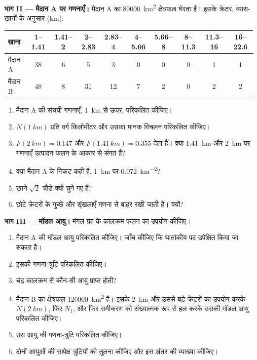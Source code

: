 \begin{problem}[{सप्ताहांत समस्या --- मंगल का क्रोड और दो
काल्पनिक लावा मैदानों की आयु}]
\medskip\noindent\textbf{भाग II --- मैदान A पर गणनाएँ।} मैदान A का
\qty{80000}{km^2} क्षेत्रफल घेरता है। इसके क्रेटर, व्यास-खानों के अनुसार (km):
\begin{center}
\small
\begin{tabular}{lccccccccc}
\hline
खाना & 1--1.41 & 1.41--2 & 2--2.83 & 2.83--4 & 4--5.66 & 5.66--8 & 8--11.3 & 11.3--16 & 16--22.6 \\
\hline
मैदान A & 38 & 6 & 5 & 3 & 0 & 0 & 0 & 1 & 1 \\
मैदान B & 48 & 8 & 31 & 12 & 7 & 2 & 0 & 2 & 2 \\
\hline
\end{tabular}
\end{center}
\begin{enumerate}[resume]
\item मैदान A की संचयी गणनाएँ, \qty{1}{km} से ऊपर, परिकलित कीजिए।
\item $N(\qty{1}{km})$ प्रति वर्ग किलोमीटर और उसका मानक
  विचलन परिकलित कीजिए।
\item {} $F(\qty{2}{km}) = 0.147$ और
  $F(\qty{1.41}{km}) = 0.355$ देता है। क्या \qty{1.41}{km} और \qty{2}{km} पर
  गणनाएँ उत्पादन फलन के आकार से संगत हैं?
\item क्या मैदान A  के निकट कहीं है,
  \qty{1}{km} पर \qty{0.072}{km^{-2}}?
\item खाने $\sqrt2$ चौड़े क्यों चुने गए हैं?
\item छोटे क्रेटरों के गुच्छे और शृंखलाएँ गणना से बाहर रखी जाती हैं। क्यों?
\end{enumerate}

\medskip\noindent\textbf{भाग III --- मॉडल आयु।} मंगल ग्रह के
कालक्रम फलन का उपयोग कीजिए।
\begin{enumerate}[resume]
\item मैदान A की मॉडल आयु परिकलित कीजिए। जाँच कीजिए कि घातांकीय पद
  उपेक्षित किया जा सकता है।
\item इसकी गणना-त्रुटि परिकलित कीजिए।
\item चंद्र कालक्रम से कौन-सी आयु प्राप्त होती?
\item मैदान B का क्षेत्रफल \qty{120000}{km^2} है। इसके \qty{2}{km} और उससे बड़े
  क्रेटरों का उपयोग करके $N(\qty{2}{km})$, फिर $N_1$, और फिर
  समीकरण को संख्यात्मक रूप से हल करके उसकी मॉडल आयु परिकलित कीजिए।
\item उस आयु की गणना-त्रुटि परिकलित कीजिए।
\item दोनों आयुओं की सापेक्ष त्रुटियों की तुलना कीजिए और
  इस अंतर की व्याख्या कीजिए।
\end{enumerate}


\end{problem}
